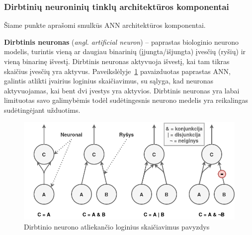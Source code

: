 \documentclass{VUMIFPSbakalaurinis}
\begin{document}
\subsubsection{Dirbtinių neuroninių tinklų architektūros komponentai}\label{subsubsec:components}
Šiame punkte aprašomi smulkūs ANN architektūros komponentai.

\label{subsubsubsec:artificial_neurons}
{
	\textbf{Dirbtinis neuronas} (\textit{angl. artificial neuron}) -- paprastas biologinio neurono modelis, turintis vieną ar daugiau binarinių (įjungta/išjungta) įvesčių (ryšių) ir vieną binarinę išvestį. Dirbtinis neuronas aktyvuoja išvestį, kai tam tikras skaičius įvesčių yra aktyvus. Paveikslėlyje~\ref{img:artificial_neurons} pavaizduotas paprastas ANN, galintis atlikti įvairius loginius skaičiavimus, su sąlyga, kad neuronas aktyvuojamas, kai bent dvi įvestys yra aktyvios. Dirbtinis neuronas yra labai limituotas savo galimybėmis todėl sudėtingesnis neurono medelis yra reikalingas sudėtingėjant užduotims. 
	
	\begin{figure}[H]
		\centering
		\includegraphics[scale=0.5]{img/artificial_neurons}
		\caption{Dirbtinio neurono atliekančio loginius skaičiavimus pavyzdys}
		\label{img:artificial_neurons}
	\end{figure} 
}
\label{subsubsubsec:ltu}
\end{document}
